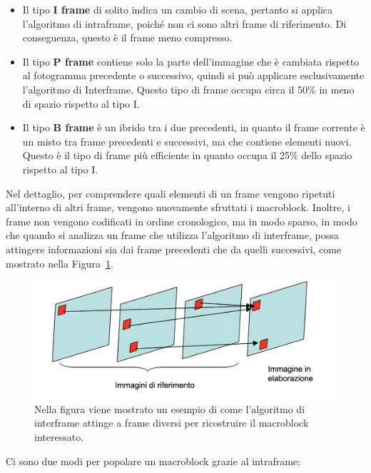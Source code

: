 \documentclass[a4paper,12pt, oneside]{article}
\begin{document}
\begin{itemize}
  \item Il tipo \textbf{I frame} di solito indica un cambio di scena, pertanto si applica l'algoritmo
  di intraframe, poiché non ci sono altri frame di riferimento. Di conseguenza, questo è il frame meno
  compresso. 
  \item Il tipo \textbf{P frame} contiene solo la parte dell'immagine che è cambiata rispetto al fotogramma
  precedente o successivo, quindi si può applicare esclusivamente l'algoritmo di Interframe. Questo tipo di
  frame occupa circa il 50\% in meno di spazio rispetto al tipo I.
  \item Il tipo \textbf{B frame} è un ibrido tra i due precedenti, in quanto il frame corrente è un misto
  tra frame precedenti e successivi, ma che contiene elementi nuovi. Questo è il tipo di frame più
  efficiente in quanto occupa il 25\% dello spazio rispetto al tipo I.
\end{itemize}

Nel dettaglio, per comprendere quali elementi di un frame vengono ripetuti all'interno di altri frame,
vengono nuovamente sfruttati i macroblock. Inoltre, i frame non vengono codificati in ordine cronologico,
ma in modo sparso, in modo che quando si analizza un frame che utilizza l'algoritmo di interframe, possa
attingere informazioni sia dai frame precedenti che da quelli successivi, come mostrato nella
Figura~\ref{fig:interframe}.

\begin{figure}[h]
    \centering
    \includegraphics[width=1\textwidth]{images/interframe.png}
    \caption{Nella figura viene mostrato un esempio di come l'algoritmo di interframe
    attinge a frame diversi per ricostruire il macroblock interessato.}
    \label{fig:interframe}
\end{figure}

\noindent Ci sono due modi per popolare un macroblock grazie al intraframe:
\end{document}
